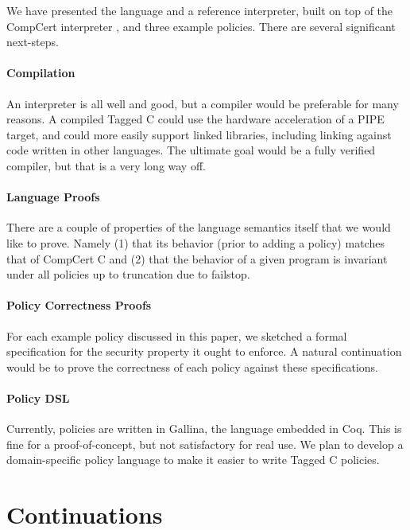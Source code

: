 \documentclass[acmsmall,review,anonymous]{acmart}\settopmatter{printfolios=true,printccs=false,printacmref=false}
\begin{document}
We have presented the language and a reference interpreter, built on top of the CompCert interpreter
\cite{Leroy09:CompCert}, and three example policies. There are several significant next-steps.

\paragraph{Compilation}

An interpreter is all well and good, but a compiler would be preferable for many reasons.
A compiled Tagged C could use the hardware acceleration of a PIPE target, and could more easily
support linked libraries, including linking against code written in other languages.
The ultimate goal would be a fully verified compiler, but that is a very long way off.

\paragraph{Language Proofs}

There are a couple of properties of the language semantics itself that we would like to prove.
Namely (1) that its behavior (prior to adding a policy) matches that of CompCert C and
(2) that the behavior of a given program is invariant under all policies up to truncation due
to failstop.

\paragraph{Policy Correctness Proofs}

For each example policy discussed in this paper, we sketched a formal specification for the
security property it ought to enforce. A natural continuation would be to prove the correctness
of each policy against these specifications.

\paragraph{Policy DSL}

Currently, policies are written in Gallina, the language embedded in Coq. This is fine for a
proof-of-concept, but not satisfactory for real use. We plan to develop a domain-specific policy
language to make it easier to write Tagged C policies.



\appendix

\section{Continuations}
\label{app:continuations}
\end{document}
